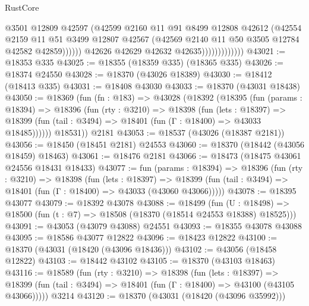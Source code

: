 \begin{lexlean}{RustCore}
\begin{coremodule}
                                    @3501
                                    @12809
                                    @42597
                                    (@42599
                                      @2160
                                      @11
                                      @91
                                      @8499
                                      @12808
                                      @42612
                                      (@42554
                                        @2159
                                        @11
                                        @51
                                        @3499
                                        @12807
                                        @42567
                                        (@42569 @2140 @11 @50 @3505 @12784 @42582 @42859))))))
                              @42626
                              @42629
                              @42632
                              @42635)))))))))))))
@43021 := @18353 @335
@43025 := @18355 (@18359 @335) (@18365 @335)
@43026 := @18374 @24550
@43028 := @18370 (@43026 @18389)
@43030 := @18412 (@18413 @335)
@43031 := @18408 @43030
@43033 := @18370 (@43031 @18438)
@43050 := @18369
    (fun (fn : @183) =>
    @43028
      (@18392
        (@18395
          (fun (params : @18394) =>
          @18396
            (fun (rty : @3210) =>
            @18398
              (fun (lets : @18397) =>
              @18399 (fun (tail : @3494) => @18401 (fun (Γ : @18400) => @43033 @18485))))))
        @18531))
    @2181
@43053 := @18537 (@43026 (@18387 @2181))
@43056 := @18450 (@18451 @2181) @24553
@43060 := @18370 (@18442 (@43056 @18459) @18463)
@43061 := @18476 @2181
@43066 := @18473 (@18475 @43061 @24556 @18431 @18433)
@43077 := fun (params : @18394) =>
  @18396
    (fun (rty : @3210) =>
    @18398
      (fun (lets : @18397) =>
      @18399 (fun (tail : @3494) => @18401 (fun (Γ : @18400) => @43033 (@43060 @43066)))))
@43078 := @18395 @43077
@43079 := @18392 @43078
@43088 := @18499
    (fun (U : @18498) => @18500 (fun (t : @7) => @18508 (@18370 (@18514 @24553 @18388) @18525)))
@43091 := @43053 (@43079 @43088) @24551
@43093 := @18355 @43078 @43088
@43095 := @18586 @43077 @12822
@43096 := @18423 @12822
@43100 := @18370 (@43031 (@18420 (@43096 @18436)))
@43102 := @43056 (@18458 @12822)
@43103 := @18442 @43102
@43105 := @18370 (@43103 @18463)
@43116 := @18589
    (fun (rty : @3210) =>
    @18398
      (fun (lets : @18397) =>
      @18399 (fun (tail : @3494) => @18401 (fun (Γ : @18400) => @43100 (@43105 @43066)))))
    @3214
@43120 := @18370 (@43031 (@18420 (@43096 @35992)))

\end{coremodule}
\end{lexlean}
